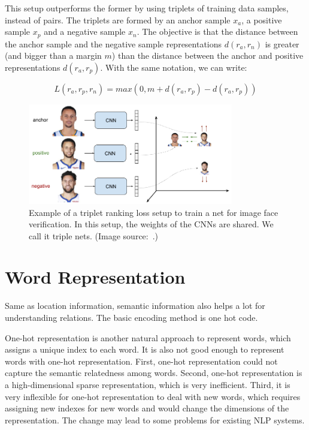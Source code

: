 This setup outperforms the former by using triplets of training data samples, instead of pairs. The triplets are formed by an anchor sample $x_a$, a positive sample $x_p$ and a negative sample $x_n$. The objective is that the distance between the anchor sample and the negative sample representations $d(r_a,r_n)$ is greater (and bigger than a margin $m$) than the distance between the anchor and positive representations $d(r_a,r_p)$. With the same notation, we can write:

\begin{equation}
L(r_a,r_p,r_n)=max(0,m+d(r_a,r_p)-d(r_a,r_p))
\label{equ:ranking_loss}
\end{equation}

\begin{figure}[!htbp]
	\centering
	\includegraphics[width = 0.8\textwidth]{figures/triplet_loss_faces.png}
	\caption[Example of a triplet ranking loss ]
	{ Example of a triplet ranking loss setup to train a net for image face verification. In this setup, the weights of the CNNs are shared. We call it triple nets. (Image source:~\cite{triplet_loss_em}.)}
	\label{fig:triplet_ranking_loss}
\end{figure}


\section{Word Representation}

Same as location information, semantic information also helps a lot for understanding relations. The basic encoding method is one hot code. 

One-hot representation is another natural approach to represent words, which assigns a unique index to each word. It is also not good enough to represent words with one-hot representation. First, one-hot representation could not capture the semantic relatedness among words. Second, one-hot representation is a high-dimensional sparse representation, which is very inefficient. Third, it is very inflexible for one-hot representation to deal with new words, which requires assigning new indexes for new words and would change the dimensions of the representation. The change may lead to some problems for existing NLP systems.

